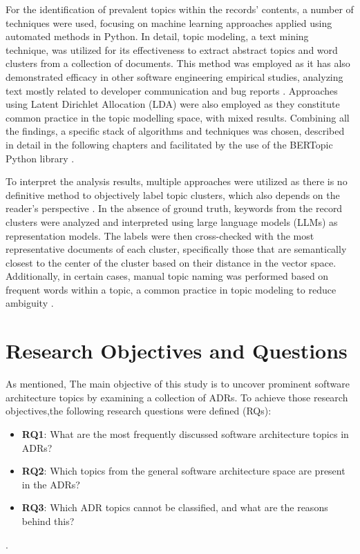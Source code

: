         For the identification of prevalent topics within the records' contents, a number of techniques were used, focusing on machine learning approaches applied using automated methods in Python. In detail, topic modeling, a text mining technique, was utilized for its effectiveness to extract abstract topics and word clusters from a collection of documents. This method was employed as it has also demonstrated efficacy in other software engineering empirical studies, analyzing text mostly related to developer communication and bug reports \cite{Topic_modeling_in_software_engineering_research}. Approaches using Latent Dirichlet Allocation (LDA) were also employed as they constitute common practice in the topic modelling space, with mixed results. Combining all the findings, a specific stack of algorithms and techniques was chosen, described in detail in the following chapters and facilitated by the use of the BERTopic Python library \cite{bertTopic}.

        To interpret the analysis results, multiple approaches were utilized as there is no definitive method to objectively label topic clusters, which also depends on the reader's perspective \cite{datasciencecentralTopicModeling}. In the absence of ground truth, keywords from the record clusters were analyzed and interpreted using large language models (LLMs) as representation models. The labels were then cross-checked with the most representative documents of each cluster, specifically those that are semantically closest to the center of the cluster based on their distance in the vector space. Additionally, in certain cases, manual topic naming was performed based on frequent words within a topic, a common practice in topic modeling to reduce ambiguity \cite{Topic_modeling_in_software_engineering_research}.
        
    \section{Research Objectives and Questions}
        As mentioned, The main objective of this study is to uncover prominent software architecture topics by examining a collection of ADRs. To achieve those research objectives,the following research questions were defined (RQs):

        \begin{itemize}
            \item \textbf{RQ1}: What are the most frequently discussed software architecture topics in ADRs?
            \item \textbf{RQ2}: Which topics from the general software architecture space are present in the ADRs?
            \item \textbf{RQ3}: Which ADR topics cannot be classified, and what are the reasons behind this? 
        \end{itemize}. 

